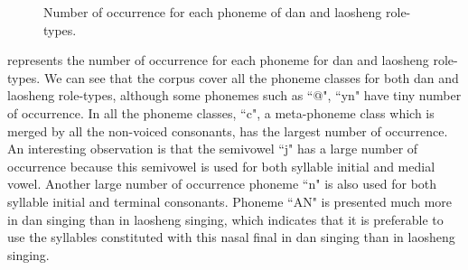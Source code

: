 \begin{figure}[ht!]
    \centering
    \hfill
  
    \caption[]{Number of occurrence for each phoneme of dan and laosheng role-types.}
    \label{fig:ch4:number_occurrence}
\end{figure}

 represents the number of occurrence for each phoneme for \gls{dan} and \gls{laosheng} role-types. We can see that the corpus cover all the phoneme classes for both \gls{dan} and \gls{laosheng} role-types, although some phonemes such as ``@", ``yn" have tiny number of occurrence. In all the phoneme classes, ``c", a meta-phoneme class which is merged by all the non-voiced consonants, has the largest number of occurrence. An interesting observation is that the semivowel ``j" has a large number of occurrence because this semivowel is used for both syllable initial and medial vowel. Another large number of occurrence phoneme ``n" is also used for both syllable initial and terminal consonants. Phoneme ``AN" is presented much more in \gls{dan} singing than in \gls{laosheng} singing, which indicates that it is preferable to use the syllables constituted with this nasal final in \gls{dan} singing than in \gls{laosheng} singing.

